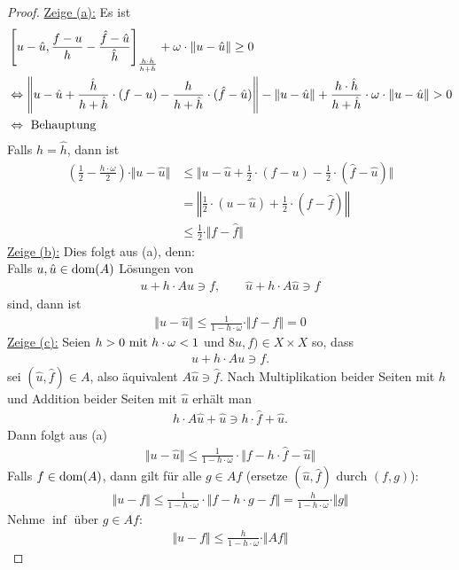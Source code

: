 \begin{proof}
\underline{Zeige (a):} Es ist
\begin{align*}
&\left[u-\hat{u},\frac{f-u}{h}-\frac{\hat{f}-\hat{u}}{\hat{h}}\right]_{\frac{h\cdot\hat{h}}{h+\hat{h}}}+\omega\cdot\Vert u-\hat{u}\Vert\geq0\\
&\gdw
\left\Vert u-\hat{u}+\frac{\hat{h}}{h+\hat{h}}\cdot(f-u)-\frac{h}{h+\hat{h}}\cdot(\hat{f}-\hat{u})\right\Vert
-\Vert u-\hat{u}\Vert+\frac{h\cdot\hat{h}}{h+\hat{h}}\cdot\omega\cdot\Vert u-\hat{u}\Vert>0\\
&\gdw\text{ Behauptung}
\end{align*}
Falls $h=\hat{h}$, dann ist
\begin{align*}
\left(\frac{1}{2}-\frac{h\cdot\omega}{2}\right)\cdot\Vert u-\hat{u}\Vert
&\leq
\Big\Vert u-\hat{u}+\frac{1}{2}\cdot(f-u)-\frac{1}{2}\cdot(\hat{f}-\hat{u})\Big\Vert\\
&=\left\Vert\frac{1}{2}\cdot(u-\hat{u})+\frac{1}{2}\cdot(f-\hat{f})\right\Vert\\
&\leq
\frac{1}{2}\cdot\Vert f-\hat{f}\Vert
\end{align*}
\underline{Zeige (b):} Dies folgt aus (a), denn:\\
Falls $u,\hat{u}\in\dom(A)$ Lösungen von
\begin{align*}
u+h\cdot Au\ni f,\qquad\hat{u}+h\cdot A\hat{u}\ni f
\end{align*}
sind, dann ist
\begin{align*}
\Vert u-\hat{u}\Vert\leq\frac{1}{1-h\cdot\omega}\cdot\Vert f-f\Vert=0
\end{align*}
\underline{Zeige (c):} Seien $h>0\mit h\cdot\omega<1$ und $8u,f)\in X\times X$ so, dass
\begin{align*}
u+h\cdot Au\ni f.
\end{align*}
sei $(\hat{u},\hat{f})\in A$, also äquivalent $A\hat{u}\ni\hat{f}$. Nach Multiplikation beider Seiten mit $h$ und Addition beider Seiten mit $\hat{u}$ erhält man
\begin{align*}
h\cdot A\hat{u}+\hat{u}\ni h\cdot\hat{f}+\hat{u}.
\end{align*}
Dann folgt aus (a)
\begin{align*}
\Vert u-\hat{u}\Vert\leq\frac{1}{1-h\cdot\omega}\cdot\big\Vert f-h\cdot\hat{f}-\hat{u}\big\Vert
\end{align*}
Falls $f\in\dom(A)$, dann gilt für alle $g\in Af$ (ersetze $(\hat{u},\hat{f})$ durch $(f,g)$):
\begin{align*}
\Vert u- f\Vert
\leq
\frac{1}{1-h\cdot\omega}\cdot\big\Vert f-h\cdot g-f\big\Vert
=\frac{h}{1-h\cdot\omega}\cdot\Vert g\Vert
\end{align*}
Nehme $\inf$ über $g\in Af$:
\begin{align*}
\Vert u-f\Vert\leq\frac{h}{1-h\cdot\omega}\cdot\Vert Af\Vert
\end{align*}
\end{proof}

